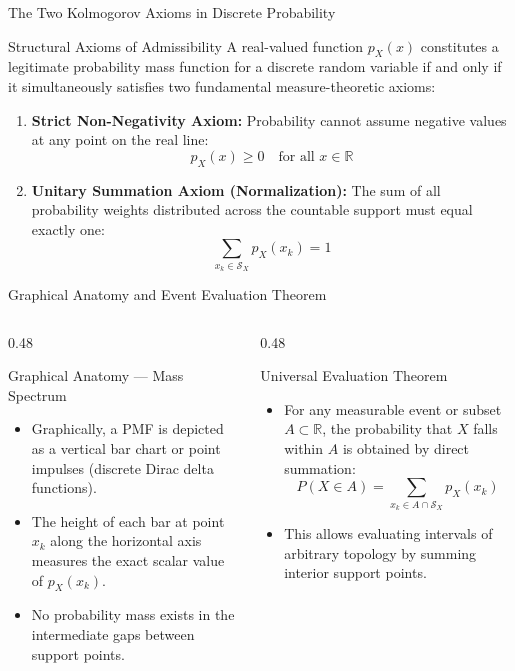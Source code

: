 \documentclass[10pt, aspectratio=169]{beamer}
\begin{document}
\begin{frame}{The Two Kolmogorov Axioms in Discrete Probability}
  \begin{block}{Structural Axioms of Admissibility}
    A real-valued function $p_X(x)$ constitutes a legitimate probability mass function for a discrete random variable if and only if it simultaneously satisfies two fundamental measure-theoretic axioms:
    \begin{enumerate}\itemsep=0.2cm
      \item \textbf{Strict Non-Negativity Axiom:} Probability cannot assume negative values at any point on the real line:
      $$p_X(x) \ge 0 \quad \text{for all } x \in \mathbb{R}$$
      \item \textbf{Unitary Summation Axiom (Normalization):} The sum of all probability weights distributed across the countable support must equal exactly one:
      $$\sum_{x_k \in \mathcal{S}_X} p_X(x_k) = 1$$
    \end{enumerate}
  \end{block}
\end{frame}

\begin{frame}{Graphical Anatomy and Event Evaluation Theorem}
  \begin{columns}[T]
    \begin{column}{0.48\textwidth}
      \begin{block}{Graphical Anatomy — Mass Spectrum}
        \small
        \begin{itemize}\itemsep=0.1cm
          \item Graphically, a PMF is depicted as a vertical bar chart or point impulses (discrete Dirac delta functions).
          \item The height of each bar at point $x_k$ along the horizontal axis measures the exact scalar value of $p_X(x_k)$.
          \item No probability mass exists in the intermediate gaps between support points.
        \end{itemize}
      \end{block}
    \end{column}
    \begin{column}{0.48\textwidth}
      \begin{alertblock}{Universal Evaluation Theorem}
        \small
        \begin{itemize}\itemsep=0.1cm
          \item For any measurable event or subset $A \subset \mathbb{R}$, the probability that $X$ falls within $A$ is obtained by direct summation:
          $$P(X \in A) = \sum_{x_k \in A \cap \mathcal{S}_X} p_X(x_k)$$
          \item This allows evaluating intervals of arbitrary topology by summing interior support points.
        \end{itemize}
      \end{alertblock}
    \end{column}
  \end{columns}
\end{frame}
\end{document}
